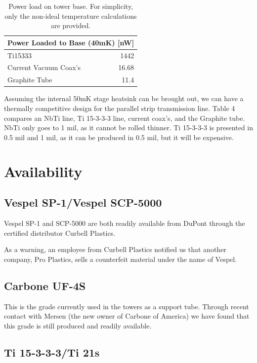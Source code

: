 \documentclass{report}
\begin{document}
\begin{multicols}{2}
\bigskip

\begin{table}
\centering
\begin{threeparttable}
\begin{tabular}{l|r}
\multicolumn{2}{c}{Power Loaded to Base (40mK) [nW]}\\\toprule
Ti15333 & 1442 \\\midrule
Current Vacuum Coax's & 16.68\\\midrule
Graphite Tube & 11.4 \\ \bottomrule
\end{tabular}
\end{threeparttable}
\caption{Power load on tower base. For simplicity, only the non-ideal temperature calculations are provided.}
\end{table}

\bigskip
Assuming the internal 50mK stage heatsink can be brought out, we can have  a thermally competitive design for the parallel strip transmission line. Table 4 compares an NbTi line, Ti 15-3-3-3 line, current coax's, and the Graphite tube. NbTi only goes to 1 mil, as it cannot be rolled thinner. Ti 15-3-3-3 is presented in 0.5 mil and 1 mil, as it can be produced in 0.5 mil, but it will be expensive.

\section{Availability}
\subsection{Vespel SP-1/Vespel SCP-5000}

Vespel SP-1 and SCP-5000 are both readily available from DuPont through the certified distributor Curbell Plastics.

As a warning, an employee from Curbell Plastics notified us that another company, Pro Plastics, sells a counterfeit material under the name of Vespel.

\subsection{Carbone UF-4S}

This is the grade currently used in the towers as a support tube. Through recent contact with Mersen (the new owner of Carbone of America) we have found that this grade is still produced and readily available.

\subsection{Ti 15-3-3-3/Ti 21s}


\end{multicols}
\end{document}
